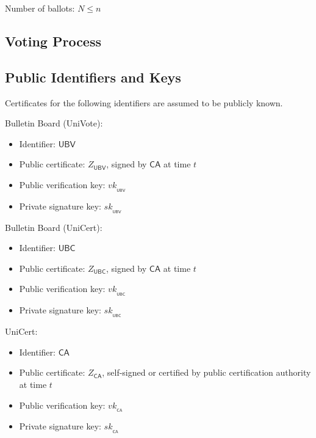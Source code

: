 \documentclass[bibtotoc,halfparskip,oneside]{scrreprt}
\newcommand{\sk}[1]{\mathit{sk}_{#1}\xspace}
\newcommand{\vk}[1]{\mathit{vk}_{#1}\xspace}
\newcommand{\SK}[1]{\sk{_#1}\xspace}
\newcommand{\VK}[1]{\vk{_#1}\xspace}
\newcommand{\CA}{\ensuremath{\mathsf{CA}}\xspace}
\newcommand{\UBC}{\ensuremath{\mathsf{UBC}}\xspace}
\newcommand{\UBV}{\ensuremath{\mathsf{UBV}}\xspace}
\begin{document}
Number of ballots: $N\leq n$

\subsection{Voting Process}

\subsection{Public Identifiers and Keys}

Certificates for the following identifiers are assumed to be publicly known.

Bulletin Board (UniVote):
\begin{itemize}
	\item Identifier: \UBV
	\item Public certificate: $Z_{\UBV}$, signed by \CA at time $t$
	\item Public verification key: $\VK{\UBV}$ 
	\item Private signature key: $\SK{\UBV}$
\end{itemize}

Bulletin Board (UniCert):
\begin{itemize}
	\item Identifier: \UBC
	\item Public certificate: $Z_{\UBC}$, signed by \CA at time $t$
	\item Public verification key: $\VK{\UBC}$ 
	\item Private signature key: $\SK{\UBC}$
\end{itemize}


UniCert:
\begin{itemize}
	\item Identifier: \CA
	\item Public certificate: $Z_{\CA}$, self-signed or certified by public certification authority at time $t$
	\item Public verification key: $\VK{\CA}$
	\item Private signature key: $\SK{\CA}$
\end{itemize}
\end{document}
